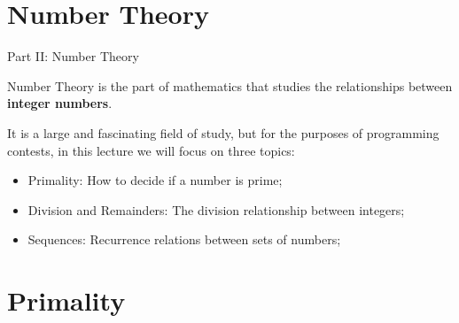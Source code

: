 
\section{Number Theory}
\begin{frame}{Part II: Number Theory}

  Number Theory is the part of mathematics that studies the relationships between {\bf integer numbers}.\bigskip

  It is a large and fascinating field of study, but for the purposes of programming contests, in this lecture we will focus on three topics:\bigskip

  \begin{itemize}
  \item Primality: How to decide if a number is prime;
  \item Division and Remainders: The division relationship between integers;
  \item Sequences: Recurrence relations between sets of numbers;
  \end{itemize}
\end{frame}

\section{Primality}
